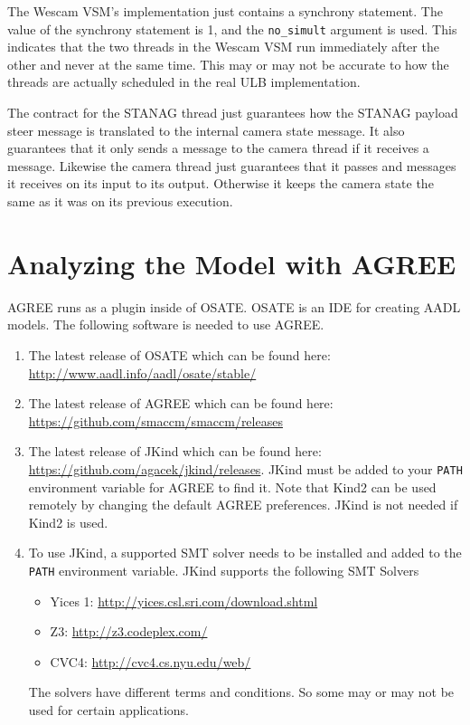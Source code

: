 \documentclass{llncs}
\begin{document}
The Wescam VSM's implementation just contains a synchrony statement.  The value of the synchrony statement is 1, and the \texttt{no\_simult} argument is used. This indicates that the two threads in the Wescam VSM run immediately after the other and never at the same time.  This may or may not be accurate to how the threads are actually scheduled in the real ULB implementation.

The contract for the STANAG thread just guarantees how the STANAG payload steer message is translated to the internal camera state message. It also guarantees that it only sends a message to the camera thread if it receives a message.  Likewise the camera thread just guarantees that it passes and messages it receives on its input to its output. Otherwise it keeps the camera state the same as it was on its previous execution.

\section{Analyzing the Model with AGREE}

AGREE runs as a plugin inside of OSATE.  OSATE is an IDE for creating AADL models.  The following software is needed to use AGREE.

\begin{enumerate}
\item The latest release of OSATE which can be found here: \url{http://www.aadl.info/aadl/osate/stable/}
\item The latest release of AGREE which can be found here: \url{https://github.com/smaccm/smaccm/releases}

\item The latest release of JKind which can be found here: \url{https://github.com/agacek/jkind/releases}.  JKind must be added to your \texttt{PATH} environment variable for AGREE to find it.  Note that Kind2 can be used remotely by changing the default AGREE preferences.  JKind is not needed if Kind2 is used.
\item To use JKind, a supported SMT solver needs to be installed and added to the \texttt{PATH} environment variable. JKind supports the following SMT Solvers
\begin{itemize}
\item Yices 1: \url{http://yices.csl.sri.com/download.shtml}
\item Z3: \url{http://z3.codeplex.com/}
\item CVC4: \url{http://cvc4.cs.nyu.edu/web/}
\end{itemize}
The solvers have different terms and conditions. So some may or may not be used for certain applications.
\end{enumerate}
\end{document}
